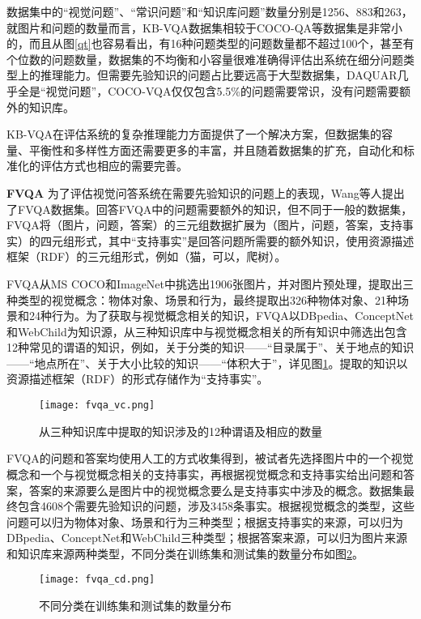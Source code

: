 数据集中的“视觉问题”、“常识问题”和“知识库问题”数量分别是1256、883和263，就图片和问题的数量而言，KB-VQA数据集相较于COCO-QA等数据集是非常小的，而且从图\ref{qt}也容易看出，有16种问题类型的问题数量都不超过100个，甚至有个位数的问题数量，数据集的不均衡和小容量很难准确得评估出系统在细分问题类型上的推理能力。但需要先验知识的问题占比要远高于大型数据集，DAQUAR几乎全是“视觉问题”，COCO-VQA仅仅包含5.5\%的问题需要常识，没有问题需要额外的知识库。

KB-VQA在评估系统的复杂推理能力方面提供了一个解决方案，但数据集的容量、平衡性和多样性方面还需要更多的丰富，并且随着数据集的扩充，自动化和标准化的评估方式也相应的需要完善。

\textbf{FVQA}
为了评估视觉问答系统在需要先验知识的问题上的表现，Wang等人提出了FVQA数据集。回答FVQA中的问题需要额外的知识，但不同于一般的数据集，FVQA将（图片，问题，答案）的三元组数据扩展为（图片，问题，答案，支持事实）的四元组形式，其中“支持事实”是回答问题所需要的额外知识，使用资源描述框架（RDF）的三元组形式，例如（猫，可以，爬树）。

FVQA从MS COCO和ImageNet中挑选出1906张图片，并对图片预处理，提取出三种类型的视觉概念：物体对象、场景和行为，最终提取出326种物体对象、21种场景和24种行为。为了获取与视觉概念相关的知识，FVQA以DBpedia、ConceptNet和WebChild为知识源，从三种知识库中与视觉概念相关的所有知识中筛选出包含12种常见的谓语的知识，例如，关于分类的知识——“目录属于”、关于地点的知识——“地点所在”、关于大小比较的知识——“体积大于”，详见图\ref{fvqa_vc}。提取的知识以资源描述框架（RDF）的形式存储作为“支持事实”。
\begin{figure}[H]
	\centering
	\texttt{[image: fvqa\_vc.png]}
	\caption{从三种知识库中提取的知识涉及的12种谓语及相应的数量}
	\label{fvqa_vc}
\end{figure}

FVQA的问题和答案均使用人工的方式收集得到，被试者先选择图片中的一个视觉概念和一个与视觉概念相关的支持事实，再根据视觉概念和支持事实给出问题和答案，答案的来源要么是图片中的视觉概念要么是支持事实中涉及的概念。数据集最终包含4608个需要先验知识的问题，涉及3458条事实。根据视觉概念的类型，这些问题可以归为物体对象、场景和行为三种类型；根据支持事实的来源，可以归为DBpedia、ConceptNet和WebChild三种类型；根据答案来源，可以归为图片来源和知识库来源两种类型，不同分类在训练集和测试集的数量分布如图\ref{fvqa_cd}。
\begin{figure}[H]
	\centering
	\texttt{[image: fvqa\_cd.png]}
	\caption{不同分类在训练集和测试集的数量分布}
	\label{fvqa_cd}
\end{figure}

